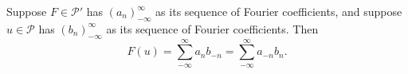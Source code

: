 \begin{theorem}
Suppose $F \in \mathcal{P}'$ has $(a_n)_{-\infty}^{\infty}$ as its sequence of Fourier coefficients, and suppose $u \in \mathcal{P}$ has $(b_n)_{-\infty}^{\infty}$ as its sequence of Fourier coefficients. Then
$$F(u) = \sum_{-\infty}^{\infty} a_n b_{-n} = \sum_{-\infty}^{\infty} a_{-n} b_n.$$
\end{theorem}
